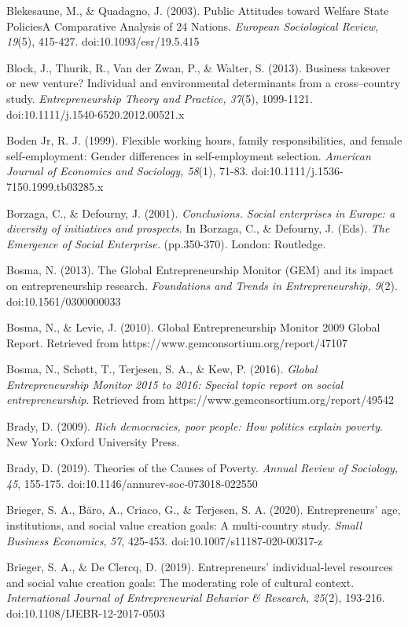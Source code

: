 \documentclass{article}
\begin{document}
Blekesaune, M., \& Quadagno, J. (2003). Public Attitudes toward Welfare State PoliciesA Comparative Analysis of 24 Nations. \emph{European Sociological Review, 19}(5), 415-427. doi:10.1093/esr/19.5.415

Block, J., Thurik, R., Van der Zwan, P., \& Walter, S. (2013). Business takeover or new venture? Individual and environmental determinants from a cross--country study. \emph{Entrepreneurship Theory and Practice, 37}(5), 1099-1121. doi:10.1111/j.1540-6520.2012.00521.x

Boden Jr, R. J. (1999). Flexible working hours, family responsibilities, and female self-employment: Gender differences in self-employment selection. \emph{American Journal of Economics and Sociology, 58}(1), 71-83. doi:10.1111/j.1536-7150.1999.tb03285.x

Borzaga, C., \& Defourny, J. (2001). \emph{Conclusions. Social enterprises in Europe: a diversity of initiatives and prospects}. In Borzaga, C., \& Defourny, J. (Eds). \emph{The Emergence of Social Enterprise. }(pp.350-370). London: Routledge.

Bosma, N. (2013). The Global Entrepreneurship Monitor (GEM) and its impact on entrepreneurship research. \emph{Foundations and Trends in Entrepreneurship, 9}(2). doi:10.1561/0300000033

Bosma, N., \& Levie, J. (2010). Global Entrepreneurship Monitor 2009 Global Report. Retrieved from https://www.gemconsortium.org/report/47107

Bosma, N., Schøtt, T., Terjesen, S. A., \& Kew, P. (2016). \emph{Global Entrepreneurship Monitor 2015 to 2016: Special topic report on social entrepreneurship}. Retrieved from https://www.gemconsortium.org/report/49542

Brady, D. (2009). \emph{Rich democracies, poor people: How politics explain poverty}. New York: Oxford University Press.

Brady, D. (2019). Theories of the Causes of Poverty. \emph{Annual Review of Sociology, 45}, 155-175. doi:10.1146/annurev-soc-073018-022550

Brieger, S. A., Bäro, A., Criaco, G., \& Terjesen, S. A. (2020). Entrepreneurs' age, institutions, and social value creation goals: A multi-country study. \emph{Small Business Economics}, \emph{57}, 425-453. doi:10.1007/s11187-020-00317-z

Brieger, S. A., \& De Clercq, D. (2019). Entrepreneurs' individual-level resources and social value creation goals: The moderating role of cultural context. \emph{International Journal of Entrepreneurial }\emph{Behavior}\emph{ \& Research, 25}(2), 193-216. doi:10.1108/IJEBR-12-2017-0503
\end{document}
